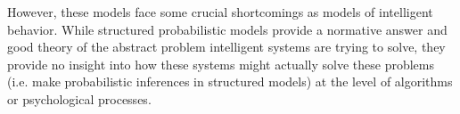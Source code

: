 However, these models face some crucial shortcomings as models of intelligent behavior. 
While structured probabilistic models provide a normative answer and good theory of the abstract problem intelligent systems are trying to solve, they provide no insight into how these systems might actually solve these problems (i.e. make probabilistic inferences in structured models) at the level of algorithms or psychological processes\citep{marr1976understanding}. %
